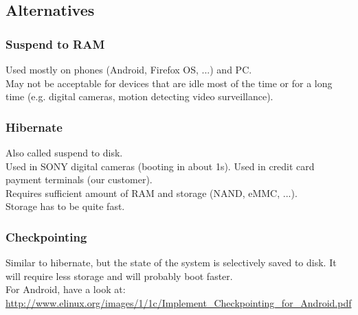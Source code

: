 \subsection{Alternatives}
\begin{frame}
\frametitle{Suspend to RAM}
Used mostly on phones (Android, Firefox OS, ...) and PC.\\
May not be acceptable for devices that are idle most of the time or
for a long time (e.g. digital cameras, motion detecting video surveillance).
\end{frame}

\begin{frame}
\frametitle{Hibernate}
Also called suspend to disk.\\
Used in SONY digital cameras (booting in about 1s). Used in credit
card payment terminals (our customer).\\
Requires sufficient amount of RAM and storage (NAND, eMMC, ...).\\
Storage has to be quite fast.
\end{frame}

\begin{frame}
\frametitle{Checkpointing}
Similar to hibernate, but the state of the system is selectively saved
to disk. It will require less storage and will probably boot faster.\\
For Android, have a look at:
\url{http://www.elinux.org/images/1/1c/Implement_Checkpointing_for_Android.pdf}
\end{frame}

